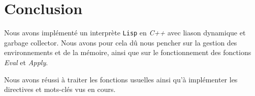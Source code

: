 \section{Conclusion}
Nous avons implémenté un interprète \texttt{Lisp} en \emph{C++} avec
liason dynamique et garbage collector. Nous avons pour cela dû nous
pencher sur la gestion des environnements et de la mémoire, ainsi que
sur le fonctionnement des fonctions \emph{Eval} et \emph{Apply}.

Nous avons réussi à traiter les fonctions usuelles ainsi qu'à
implémenter les directives et mots-clés vus en cours.

\appendix
